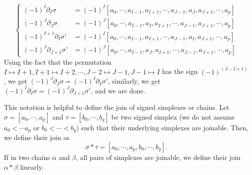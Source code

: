 \documentclass[reprint, amsmath, amssymb, showpacs, floatfix, longbibliography, aps, twocolumn, superscriptaddress, nofootinbib]{revtex4-2}
\theoremstyle{definition}
\begin{document}
\begin{equation}
	\left\{
	\begin{aligned}
		(-1)^I\partial_I\sigma&= (-1)^I[a_0,\cdots,a_{I-1},a_{I+1},\cdots,a_{J-1},a_J,a_{J+1},\cdots, a_p]\\
		(-1)^J\partial_J\sigma&= (-1)^J[a_0,\cdots,a_{I-1},a_I,a_{I+1},\cdots,a_{J-1},a_{J+1},\cdots, a_p]\\
		(-1)^{I+1}\partial_I\sigma'&=(-1)^I[a_0,\cdots,a_{I-1},a_{I+1},\cdots,a_{J-1},a_I,a_{J+1},\cdots, a_p]\\
	(-1)^J\partial_{J+1}\sigma'&= (-1)^J[a_0,\cdots,a_{I-1},a_J,a_{I+1},\cdots,a_{J-1},a_{J+1},\cdots, a_p]
	\end{aligned}
	\right.
\end{equation}
Using the fact that the permutation $I\mapsto I+1,I+1\mapsto I+2,\cdots, J-2\mapsto J-1,J-1\mapsto I$ has the sign $(-1)^(J-I+1)$, we get $(-1)^J\partial_J\sigma=(-1)^I\partial_I\sigma'$, similarly, we get $	(-1)^I\partial_I\sigma=(-1)^J\partial_{J+1}\sigma'$, and we are done.

This notation is helpful to define the join of signed simplexes or chains.
Let $\sigma=[a_0,\cdots,a_p]$ and $\tau=[b_0,\cdots,b_q]$ be two signed simplex (we do not assume $a_0<\cdots a_p$ or $b_0<\cdots<b_q$) such that their underlying simplexes are joinable. Then, we define their join as
\begin{equation}
	\sigma*\tau=[a_0,\cdots,a_p,b_0,\cdots,b_q].
\end{equation}
If in two chains $\alpha$ and $\beta$, all pairs of simplexes are joinable, we define their join $\alpha*\beta$ linearly.
\end{document}
